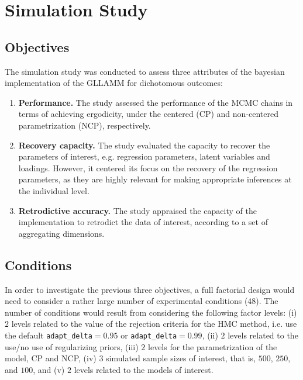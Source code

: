 \chapter{Simulation Study} \label{chap:simulation}

\section{Objectives} \label{sec:objectives}

The simulation study was conducted to assess three attributes of the bayesian implementation of the GLLAMM for dichotomous outcomes:
%
\begin{enumerate}
	\item \textbf{Performance.} The study assessed the performance of the MCMC chains in terms of achieving ergodicity, under the centered (CP) and non-centered parametrization (NCP), respectively.
	\item \textbf{Recovery capacity.} The study evaluated the capacity to recover the parameters of interest, e.g. regression parameters, latent variables and loadings. However, it centered its focus on the recovery of the regression parameters, as they are highly relevant for making appropriate inferences at the individual level.
	\item \textbf{Retrodictive accuracy.} The study appraised the capacity of the implementation to retrodict the data of interest, according to a set of aggregating dimensions.
\end{enumerate} 


\section{Conditions} \label{sec:conditions}

In order to investigate the previous three objectives, a full factorial design would need to consider a rather large number of experimental conditions ($48$). The number of conditions would result from considering the following factor levels: (i) $2$ levels related to the value of the rejection criteria for the HMC method, i.e. use the default \texttt{adapt\_delta}$=0.95$ or \texttt{adapt\_delta}$=0.99$, (ii) $2$ levels related to the use/no use of regularizing priors, (iii) $2$ levels for the parametrization of the model, CP and NCP, (iv) $3$ simulated sample sizes of interest, that is, $500$, $250$, and $100$, and (v) $2$ levels related to the models of interest.

